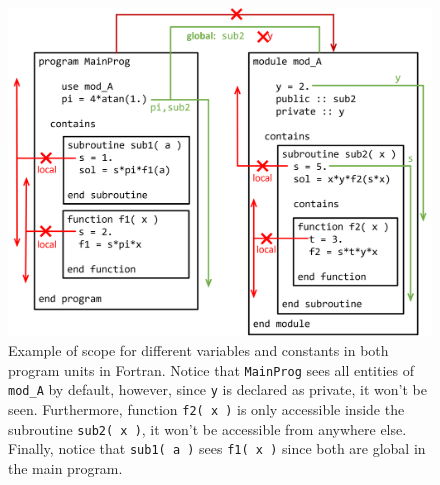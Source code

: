 \begin{figure}[h]
    \centering
    \includegraphics[width= \textwidth]{./doc/Figures/ScopeFor.png}
    \caption{Example of scope for different variables and constants in both program units in Fortran. Notice that \texttt{MainProg} sees all entities of \texttt{mod\_A} by default, however, since \texttt{y} is declared as private, it won't be seen. Furthermore, function \texttt{f2( x )} is only accessible inside the subroutine \texttt{sub2( x )}, it won't be accessible from anywhere else. Finally, notice that \texttt{sub1( a )} sees \texttt{f1( x )} since both are global in the main program.}
    \label{fig:ScopeFor}
\end{figure}


